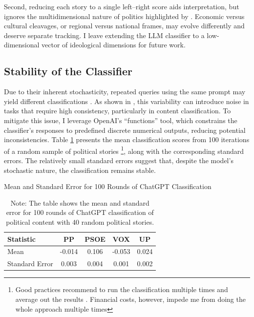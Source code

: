 \documentclass[12pt]{article}
\begin{document}
Second, reducing each story to a single left–right score aids interpretation, but ignores the multidimensional nature of politics highlighted by \citet{puglisi2011newspapers}. Economic versus cultural cleavages, or regional versus national frames, may evolve differently and deserve separate tracking. I leave extending the LLM classifier to a low-dimensional vector of ideological dimensions for future work.




\subsection{Stability of the Classifier}


Due to their inherent stochasticity, repeated queries using the same prompt may yield different classifications \citep{llmstability2024}. As shown in \citep{llmclassification2024}, this variability can introduce noise in tasks that require high consistency, particularly in content classification. To mitigate this issue, I leverage OpenAI’s “functions” tool, which constrains the classifier’s responses to predefined discrete numerical outputs, reducing potential inconsistencies. Table \ref{tab:table_stability} presents the mean classification scores from 100 iterations of a random sample of political stories \footnote{Good practices recommend to run the classification multiple times and average out the results \citep{tornberg2023}. Financial costs, however, impede me from doing the whole approach multiple times}, along with the corresponding standard errors. The relatively small standard errors suggest that, despite the model’s stochastic nature, the classification remains stable.





\begin{table}[!htb]
	\centering
	\caption{Mean and Standard Error for 100 Rounds of ChatGPT Classification}
	\begin{tabular}{|l|c|c|c|c|}
		\hline
		\textbf{Statistic} & \textbf{PP} & \textbf{PSOE} & \textbf{VOX} & \textbf{UP} \\
		\hline
		Mean & -0.014 & 0.106 & -0.053 & 0.024 \\
		Standard Error & 0.003 & 0.004 & 0.001 & 0.002 \\
		\hline
	\end{tabular}
	\caption*{Note: The table shows the mean and standard error for 100 rounds of ChatGPT classification of political content with 40 random political stories.}
	\label{tab:table_stability}
\end{table}
\end{document}
